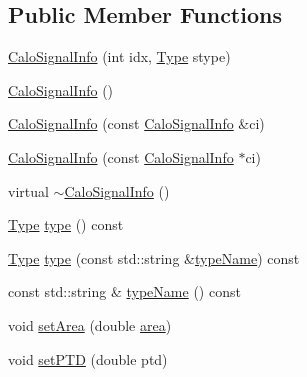 \subsection*{Public Member Functions}
\begin{DoxyCompactItemize}
\item 
\hyperlink{classAnalysis_1_1FastJet_1_1CaloSignalInfo_a1c052e698143cf8df61401bf14211c63}{Calo\+Signal\+Info} (int idx, \hyperlink{classAnalysis_1_1FastJet_1_1CaloSignalInfo_ac03e8f6d7fb631eab49a9ab02cda7675}{Type} stype)
\item 
\hyperlink{classAnalysis_1_1FastJet_1_1CaloSignalInfo_a6e6e4b3fddd49811dbe358bdd9925e2c}{Calo\+Signal\+Info} ()
\item 
\hyperlink{classAnalysis_1_1FastJet_1_1CaloSignalInfo_ad95c893fa0a848f5e9d236f6f8a95754}{Calo\+Signal\+Info} (const \hyperlink{classAnalysis_1_1FastJet_1_1CaloSignalInfo}{Calo\+Signal\+Info} \&ci)
\item 
\hyperlink{classAnalysis_1_1FastJet_1_1CaloSignalInfo_a44997a907fd4e790004a96ff9839c7b3}{Calo\+Signal\+Info} (const \hyperlink{classAnalysis_1_1FastJet_1_1CaloSignalInfo}{Calo\+Signal\+Info} $\ast$ci)
\item 
virtual \hyperlink{classAnalysis_1_1FastJet_1_1CaloSignalInfo_af5f8d21c9cc239c7353d74901fa23101}{$\sim$\+Calo\+Signal\+Info} ()
\item 
\hyperlink{classAnalysis_1_1FastJet_1_1CaloSignalInfo_ac03e8f6d7fb631eab49a9ab02cda7675}{Type} \hyperlink{classAnalysis_1_1FastJet_1_1CaloSignalInfo_abac003e16f1fae225bb6d3627a71e8ac}{type} () const 
\item 
\hyperlink{classAnalysis_1_1FastJet_1_1CaloSignalInfo_ac03e8f6d7fb631eab49a9ab02cda7675}{Type} \hyperlink{classAnalysis_1_1FastJet_1_1CaloSignalInfo_a4ce902eef34836cb0736e6c133294a69}{type} (const std\+::string \&\hyperlink{classAnalysis_1_1FastJet_1_1CaloSignalInfo_acc8335b43ac3e8cc2cc040c230b50aa3}{type\+Name}) const 
\item 
const std\+::string \& \hyperlink{classAnalysis_1_1FastJet_1_1CaloSignalInfo_acc8335b43ac3e8cc2cc040c230b50aa3}{type\+Name} () const 
\item 
void \hyperlink{classAnalysis_1_1FastJet_1_1CaloSignalInfo_ac8ec46a412dbacf12caca458a0aec2f0}{set\+Area} (double \hyperlink{classAnalysis_1_1FastJet_1_1CaloSignalInfo_a4998572743794def4adae57cf3865a2c}{area})
\item 
void \hyperlink{classAnalysis_1_1FastJet_1_1CaloSignalInfo_a2003366c8743fc150442bf638d15b688}{set\+P\+TD} (double ptd)
\item 

\end{DoxyCompactItemize}
